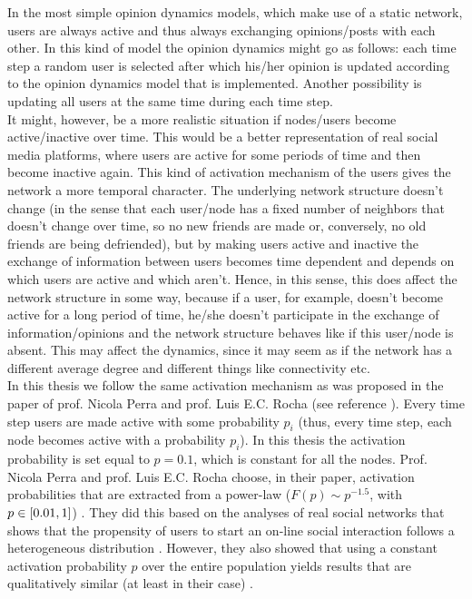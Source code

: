 \documentclass[11 pt , letterpaper , twoside , openright]{book}
\begin{document}
In the most simple opinion dynamics models, which make use of a static network, users are always active and thus always exchanging opinions/posts with each other. In this kind of model the opinion dynamics might go as follows: each time step a random user is selected after which his/her opinion is updated according to the opinion dynamics model that is implemented. Another possibility is updating all users at the same time during each time step. \\
It might, however, be a more realistic situation if nodes/users become active/inactive over time. This would be a better representation of real social media platforms, where users are active for some periods of time and then become inactive again. This kind of activation mechanism of the users gives the network a more temporal character. The underlying network structure doesn't change (in the sense that each user/node has a fixed number of neighbors that doesn't change over time, so no new friends are made or, conversely, no old friends are being defriended), but by making users active and inactive the exchange of information between users becomes time dependent and depends on which users are active and which aren't. Hence, in this sense, this does affect the network structure in some way, because if a user, for example, doesn't become active for a long period of time, he/she doesn't participate in the exchange of information/opinions and the network structure behaves like if this user/node is absent. This may affect the dynamics, since it may seem as if the network has a different average degree and different things like connectivity etc. \\
\newline
In this thesis we follow the same activation mechanism as was proposed in the paper of prof. Nicola Perra and prof. Luis E.C. Rocha (see reference \cite{Perra2019}). Every time step users are made active with some probability $p_i$ (thus, every time step, each node becomes active with a probability $p_i$). In this thesis the activation probability is set equal to $p = 0.1$, which is constant for all the nodes. Prof. Nicola Perra and prof. Luis E.C. Rocha choose, in their paper, activation probabilities that are extracted from a power-law ($F(p) \sim p^{-1.5}$, with $p \in \interval{0.01}{1}$) \cite{Perra2019}. They did this based on the analyses of real social networks that shows that the propensity of users to start an on-line social interaction follows a heterogeneous distribution \cite{Perra2012}\cite{Perra2019}. However, they also showed that using a constant activation probability $p$ over the entire population yields results that are qualitatively similar (at least in their case) \cite{Perra2019}. \\
\end{document}
